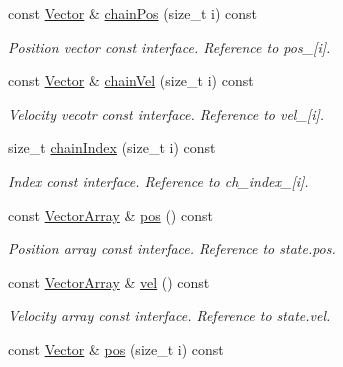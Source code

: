 \begin{DoxyCompactItemize}
const \mbox{\hyperlink{class_space_h_1_1_vel_indep_particles_a61bbcfdb0dc7f99f3c68af69a755c935}{Vector}} \& \mbox{\hyperlink{class_space_h_1_1_vel_indep_chain_particles_a1d1f6b6ed5e916f84e6502d98773ed13}{chain\+Pos}} (size\+\_\+t i) const
\begin{DoxyCompactList}\small\item\em Position vector const interface. Reference to pos\+\_\+\mbox{[}i\mbox{]}. \end{DoxyCompactList}\item 
const \mbox{\hyperlink{class_space_h_1_1_vel_indep_particles_a61bbcfdb0dc7f99f3c68af69a755c935}{Vector}} \& \mbox{\hyperlink{class_space_h_1_1_vel_indep_chain_particles_a05d9529a4ee452b4c15efe92584a6d25}{chain\+Vel}} (size\+\_\+t i) const
\begin{DoxyCompactList}\small\item\em Velocity vecotr const interface. Reference to vel\+\_\+\mbox{[}i\mbox{]}. \end{DoxyCompactList}\item 
size\+\_\+t \mbox{\hyperlink{class_space_h_1_1_vel_indep_chain_particles_ae66137f6ce2394142db438fd010ae17c}{chain\+Index}} (size\+\_\+t i) const
\begin{DoxyCompactList}\small\item\em Index const interface. Reference to ch\+\_\+index\+\_\+\mbox{[}i\mbox{]}. \end{DoxyCompactList}\item 
const \mbox{\hyperlink{class_space_h_1_1_vel_indep_particles_aa9983058940249df8b00fa800e8cbad2}{Vector\+Array}} \& \mbox{\hyperlink{class_space_h_1_1_vel_indep_chain_particles_adaa5317f0c4a09c847d830de1691d156}{pos}} () const
\begin{DoxyCompactList}\small\item\em Position array const interface. Reference to state.\+pos. \end{DoxyCompactList}\item 
const \mbox{\hyperlink{class_space_h_1_1_vel_indep_particles_aa9983058940249df8b00fa800e8cbad2}{Vector\+Array}} \& \mbox{\hyperlink{class_space_h_1_1_vel_indep_chain_particles_aadbc08f6cf8da3e46eb8d6c619e30c2f}{vel}} () const
\begin{DoxyCompactList}\small\item\em Velocity array const interface. Reference to state.\+vel. \end{DoxyCompactList}\item 
const \mbox{\hyperlink{class_space_h_1_1_vel_indep_particles_a61bbcfdb0dc7f99f3c68af69a755c935}{Vector}} \& \mbox{\hyperlink{class_space_h_1_1_vel_indep_chain_particles_a5cae7fea0fe56f87e1e1ca7da09fdeae}{pos}} (size\+\_\+t i) const

\end{DoxyCompactItemize}
